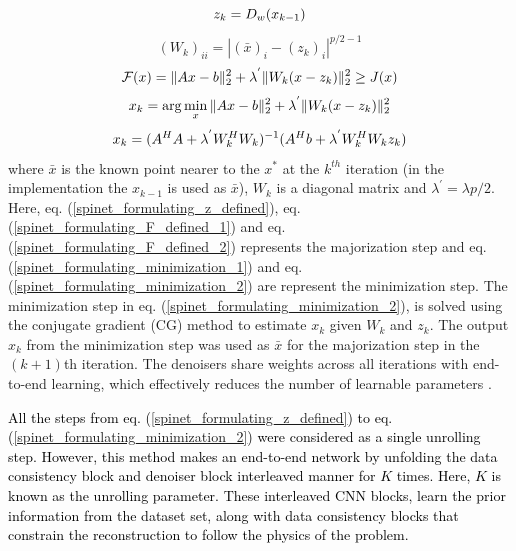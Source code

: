 \documentclass[sn-vancouver,Numbered]{sn-jnl}%
\begin{document}
\vspace{1mm}
\begin{equation}
\label{spinet_formulating_z_defined}
\centering    
z_{k}=D_w(x_{k-1})
\end{equation}
\vspace{-1mm}
\begin{equation}
\label{spinet_formulating_F_defined_1}
    (W_{k})_{ii}=|(\bar{x})_{i}-(z_{k})_{i}|^{p/2-1}
\end{equation}
\vspace{-1mm}
\begin{equation}
\label{spinet_formulating_F_defined_2}
\centering    
   \mathcal{F}(x) = \|Ax-b\|_{2}^{2}+ \lambda^{'} \|W_{k}(x-z_{k})\|_{2}^{2} \geq J(x)
\end{equation}
\vspace{-1mm}
\begin{equation}
\label{spinet_formulating_minimization_1}
\centering
   x_{k}=\arg \min_{x} \|Ax-b\|_{2}^{2}+ \lambda^{'} \|W_{k} (x-z_{k})\|_{2}^{2}
\end{equation}
\vspace{-1mm}
\begin{equation}
\label{spinet_formulating_minimization_2}
\centering
   x_{k}=(A^{H}A+\lambda^{'}W_{k}^{H}W_{k})^{-1}(A^Hb+\lambda^{'}W_{k}^{H}W_{k}z_{k})
\end{equation}
\vspace{1mm}
\noindent where $\bar{x}$ is the known point nearer to the $x^{*}$ at the $k^{th}$ iteration (in the implementation the $x_{k-1}$ is used as $\bar{x}$), $W_k$ is a diagonal matrix and $\lambda^{'}=\lambda p/2$.
Here, eq. (\ref{spinet_formulating_z_defined}), eq. (\ref{spinet_formulating_F_defined_1}) and eq. (\ref{spinet_formulating_F_defined_2}) represents the majorization step and eq. (\ref{spinet_formulating_minimization_1}) and eq. (\ref{spinet_formulating_minimization_2}) are represent the minimization step. The minimization step in eq. (\ref{spinet_formulating_minimization_2}), is solved using the conjugate gradient (CG) method to estimate $x_{k}$ given $W_{k}$ and $z_{k}$. The output $x_{k}$ from the minimization step was used as $\bar{x}$ for the majorization step in the $(k+1)$th iteration. The denoisers share weights across all iterations with end-to-end learning, which effectively reduces the number of learnable parameters \cite{MoDL}.


\textcolor{black}{All the steps from eq. (\ref{spinet_formulating_z_defined}) to eq. (\ref{spinet_formulating_minimization_2}) were considered as a single unrolling step. However, this method makes an end-to-end network by unfolding the data consistency block and denoiser block interleaved manner for $K$ times. Here, $K$ is known as the unrolling parameter. These interleaved CNN blocks, learn the prior information from the dataset set, along with data consistency blocks that constrain the reconstruction to follow the physics of the problem. }
\end{document}
